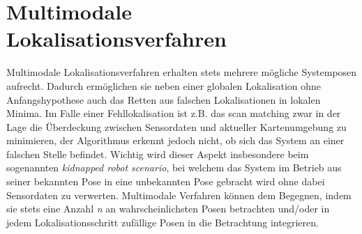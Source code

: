 \section{Multimodale Lokalisationsverfahren}
Multimodale Lokalisationsverfahren erhalten stets mehrere mögliche Systemposen aufrecht. Dadurch ermöglichen sie neben einer globalen Lokalisation ohne Anfangshypothese auch das Retten aus falschen Lokalisationen in lokalen Minima. Im Falle einer Fehllokalisation ist z.B. das scan matching zwar in der Lage die Überdeckung zwischen Sensordaten und aktueller Kartenumgebung zu minimieren, der Algorithmus erkennt jedoch nicht, ob sich das System an einer falschen Stelle befindet. Wichtig wird dieser Aspekt insbesondere beim sogenannten \textit{kidnapped robot scenario}, bei welchem das System im Betrieb aus seiner bekannten Pose in eine unbekannten Pose gebracht wird \cite{Yic2011} ohne dabei Sensordaten zu verwerten. Multimodale Verfahren können dem Begegnen, indem sie stets eine Anzahl \textit{n} an wahrscheinlichsten Posen betrachten und/oder in jedem Lokalisationsschritt zufällige Posen in die Betrachtung integrieren.\\
